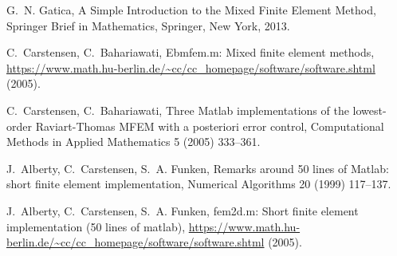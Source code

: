 \documentclass[3p]{elsarticle}
\begin{document}
\begin{thebibliography}{10}
G.~N. Gatica, A Simple Introduction to the Mixed Finite Element Method,
  Springer Brief in Mathematics, Springer, New York, 2013.

C.~Carstensen, C.~Bahariawati, Ebmfem.m: Mixed finite element methods,
  \url{https://www.math.hu-berlin.de/~cc/cc_homepage/software/software.shtml}
  (2005).

C.~Carstensen, C.~Bahariawati, Three {M}atlab implementations of the
  lowest-order {R}aviart-{T}homas {MFEM} with a posteriori error control,
  Computational Methods in Applied Mathematics 5 (2005) 333--361.

J.~Alberty, C.~Carstensen, S.~A. Funken, Remarks around 50 lines of {M}atlab:
  short finite element implementation, Numerical Algorithms 20 (1999) 117--137.

J.~Alberty, C.~Carstensen, S.~A. Funken, fem2d.m: Short finite element
  implementation (50 lines of matlab),
  \url{https://www.math.hu-berlin.de/~cc/cc_homepage/software/software.shtml}
  (2005).

\end{thebibliography}
\end{document}
